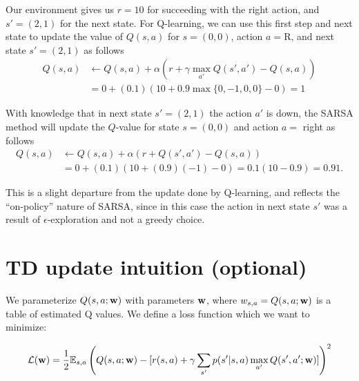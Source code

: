 \documentclass[12pt]{article}
\begin{document}
\vspace{0.5pc}

\begin{solution}
 
\begin{enumerate}
\bf{
\item Our environment gives us $r = 10$ for succeeding with the right
  action, and $s' = (2,1)$ for the next state.
%
  For Q-learning, we can use this first step
  and next state to update the value of $Q(s,a)$ for $s=(0,0)$,
action   $a=\text{R}$, and next state $s'=(2,1)$  as follows
%
\begin{align}
  Q(s,a)&\leftarrow Q(s,a)+\alpha(r+\gamma\max_{a'}Q(s',a')-Q(s,a))
  \\
        &=0 + (0.1)(10+0.9\max\{0,-1,0,0\}-0) = 1
\end{align}

\item With knowledge that in next 
  state $s'=(2,1)$ the action $a'$ is down, the SARSA method will
  update the $Q$-value for state $s=(0,0)$ and action $a=$ right as follows
  \begin{align}
    Q(s,a)&\leftarrow Q(s,a)+\alpha(r+Q(s',a')-Q(s,a))\\
    &=0+(0.1)(10+(0.9)(-1)-0)=0.1(10-0.9)=0.91.
  \end{align}

  \item 
  This is a slight departure from the update done by Q-learning, and
  reflects the ``on-policy'' nature of SARSA, since in this case the
  action in next state $s'$ was a result of $\epsilon$-exploration and
  not a greedy choice.
}
\end{enumerate}
\end{solution}

\section{TD update intuition (optional)}

We parameterize $Q(s,a; \mathbf{w})$ with parameters $\mathbf{w}$, where $w_{s,a} = Q(s,a;\mathbf{w})$ is a table of estimated Q values. We define a loss function which we want to minimize:

\begin{align}
\mathcal{L}(\mathbf{w}) = \frac{1}{2}\mathbb{E}_{s,a}\left( Q(s,a; \mathbf{w}) - [r(s,a) + \gamma\sum_{s'}p(s'|s, a)\max_{a'}Q(s', a'; \mathbf{w})
]\right)^2
\end{align}
\end{document}
